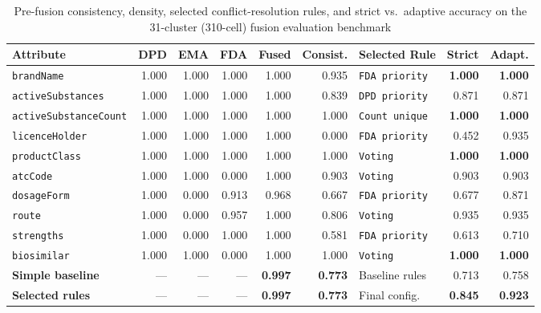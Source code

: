 \documentclass{llncs}
\begin{document}
\begin{table}[htbp]
\centering
\caption{Pre-fusion consistency, density, selected conflict-resolution rules, and strict vs.\ adaptive accuracy on the 31-cluster (310-cell) fusion evaluation benchmark}
\label{tab:fusion_results}
\scriptsize
\setlength{\tabcolsep}{2.2pt}
\begin{tabularx}{\textwidth}{|>{\raggedright\arraybackslash}X|r|r|r|r|r|l|r|r|}
\hline
\textbf{Attribute} & \textbf{DPD} & \textbf{EMA} & \textbf{FDA} & \textbf{Fused} & \textbf{Consist.} & \textbf{Selected Rule} & \textbf{Strict} & \textbf{Adapt.} \\
\hline
\texttt{brandName}            & 1.000 & 1.000 & 1.000 & 1.000 & 0.935 & \texttt{FDA priority} & \textbf{1.000} & \textbf{1.000} \\
\texttt{activeSubstances}     & 1.000 & 1.000 & 1.000 & 1.000 & 0.839 & \texttt{DPD priority} & 0.871 & 0.871 \\
\texttt{activeSubstanceCount} & 1.000 & 1.000 & 1.000 & 1.000 & 1.000 & \texttt{Count unique} & \textbf{1.000} & \textbf{1.000} \\
\texttt{licenceHolder}        & 1.000 & 1.000 & 1.000 & 1.000 & 0.000 & \texttt{FDA priority} & 0.452 & 0.935 \\
\texttt{productClass}         & 1.000 & 1.000 & 1.000 & 1.000 & 1.000 & \texttt{Voting}       & \textbf{1.000} & \textbf{1.000} \\
\texttt{atcCode}              & 1.000 & 1.000 & 0.000 & 1.000 & 0.903 & \texttt{Voting}       & 0.903 & 0.903 \\
\texttt{dosageForm}           & 1.000 & 0.000 & 0.913 & 0.968 & 0.667 & \texttt{FDA priority} & 0.677 & 0.871 \\
\texttt{route}                & 1.000 & 0.000 & 0.957 & 1.000 & 0.806 & \texttt{Voting}       & 0.935 & 0.935 \\
\texttt{strengths}            & 1.000 & 0.000 & 1.000 & 1.000 & 0.581 & \texttt{FDA priority} & 0.613 & 0.710 \\
\texttt{biosimilar}           & 1.000 & 1.000 & 0.000 & 1.000 & 1.000 & \texttt{Voting}       & \textbf{1.000} & \textbf{1.000} \\
\hline
\textbf{Simple baseline}      & ---   & ---   & ---   & \textbf{0.997} & \textbf{0.773} & Baseline rules & 0.713 & 0.758 \\
\textbf{Selected rules}       & ---   & ---   & ---   & \textbf{0.997} & \textbf{0.773} & Final config.  & \textbf{0.845} & \textbf{0.923} \\
\hline
\end{tabularx}
\end{table}
\end{document}
